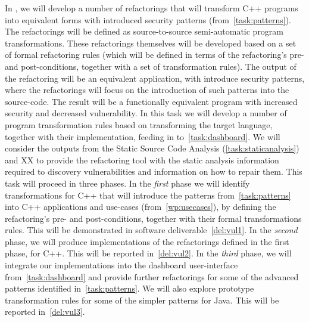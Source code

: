 \begin{Workpackage}{\thewpno}
\begin{Task}
\TaskResults{%
\ref{del:vul1},
\ref{del:vul2},
\ref{del:vul3}
}
\TaskHeader{}

In \theTask{}, we will develop a number of refactorings that will transform C++ programs into equivalent forms with introduced security patterns (from~\ref{task:patterns}). The refactorings will be defined as source-to-source semi-automatic program transformations. 
%
%
%
These refactorings themselves will be developed based on a set of formal refactoring rules (which will be defined in terms of the refactoring's pre- and post-conditions, together with a set of transformation rules). The output of the refactoring will be an equivalent application, with introduce security patterns, where the refactorings will focus on the introduction of such patterns into the source-code. The result will be a functionally equivalent program with increased security and decreased vulnerability. In this task we will develop a number of program transformation rules based on transforming the target language, together with their implementation, feeding in to~\ref{task:dashboard}. We will consider the outputs from the Static Source Code Analysis (\ref{task:staticanalysis})   and XX to provide the refactoring tool with the static analysis information required to discovery vulnerabilities and information on how to repair them.
%
This task will proceed in three phases. In the \emph{first} phase we will identify transformations for C++  that will introduce the patterns from~\ref{task:patterns} into C++ applications and use-cases (from~\ref{wp:usecases}), by defining the refactoring's  pre- and post-conditions, together with their formal transformations rules. This will be demonstrated in software deliverable~\ref{del:vul1}. In the \emph{second} phase, we will produce implementations of the refactorings defined in the first phase, for C++. This will be reported in~\ref{del:vul2}.
 In the \emph{third} phase, we will integrate our implementations into the dashboard user-interface from~\ref{task:dashboard} and provide further refactorings for some of the advanced patterns identified in~\ref{task:patterns}.
We will also explore prototype transformation rules for some of the simpler patterns for Java. This will be reported in~\ref{del:vul3}.


\end{Task}
\end{Workpackage}

